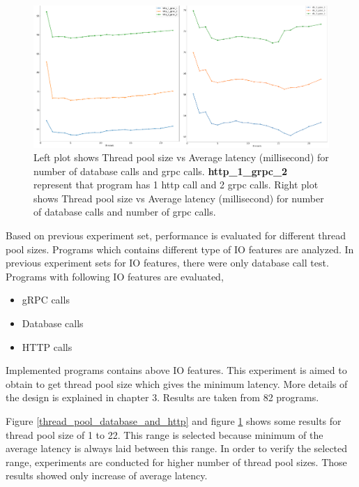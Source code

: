 \begin{figure}[htbp]
	\begin{center}
		\includegraphics[scale=1]{figures/pool-http-db-db-grpc.png}
	\end{center}
	\caption{Left plot shows Thread pool size vs Average latency (millisecond) for number of database calls and grpc calls. \textbf{http\_1\_grpc\_2} represent that program has 1 http call and 2 grpc calls. Right plot shows Thread pool size vs Average latency (millisecond) for number of database calls and number of grpc calls.}
	\label{thread_pool_http_db_and_db_grpc}
\end{figure}

Based on previous experiment set, performance is evaluated for different thread pool sizes. Programs which contains different type of IO features are analyzed. In previous experiment sets for IO features,  there were only database call test. Programs with following IO features are evaluated,
\begin{itemize}
	\item gRPC calls
	\item Database calls
	\item HTTP calls
\end{itemize}

Implemented programs contains above IO features. This experiment is aimed to obtain to get thread pool size which gives the minimum latency. More details of the design is explained in chapter 3. Results are taken from  82 programs.

Figure \ref{thread_pool_database_and_http} and figure \ref{thread_pool_http_db_and_db_grpc} shows some results for thread pool size of 1 to 22. This range is selected because minimum of the average latency is always laid between this range. In order to verify the selected range, experiments are conducted for higher number of thread pool sizes. Those results showed only increase of average latency. 

